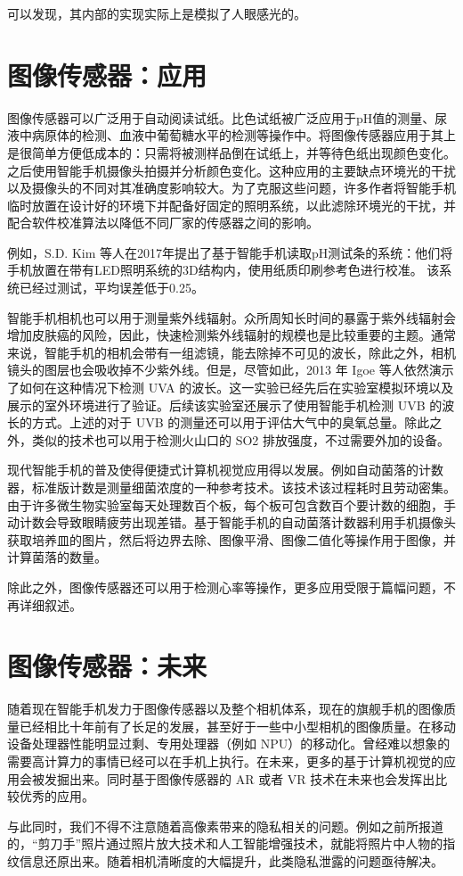 \documentclass[lang=cn]{elegantpaper}
\begin{document}
可以发现，其内部的实现实际上是模拟了人眼感光的。

\section{图像传感器：应用}

图像传感器可以广泛用于自动阅读试纸。比色试纸被广泛应用于pH值的测量、尿液中病原体的检测、血液中葡萄糖水平的检测等操作中。将图像传感器应用于其上是很简单方便低成本的：只需将被测样品倒在试纸上，并等待色纸出现颜色变化。之后使用智能手机摄像头拍摄并分析颜色变化。这种应用的主要缺点环境光的干扰以及摄像头的不同对其准确度影响较大。为了克服这些问题，许多作者将智能手机临时放置在设计好的环境下并配备好固定的照明系统，以此滤除环境光的干扰，并配合软件校准算法以降低不同厂家的传感器之间的影响。

例如，S.D. Kim 等人在2017年提出了基于智能手机读取pH测试条的系统\cite{kim2017smartphone}：他们将手机放置在带有LED照明系统的3D结构内，使用纸质印刷参考色进行校准。 该系统已经过测试，平均误差低于0.25。


智能手机相机也可以用于测量紫外线辐射。众所周知长时间的暴露于紫外线辐射会增加皮肤癌的风险，因此，快速检测紫外线辐射的规模也是比较重要的主题。通常来说，智能手机的相机会带有一组滤镜，能去除掉不可见的波长，除此之外，相机镜头的图层也会吸收掉不少紫外线。但是，尽管如此，2013 年 Igoe 等人依然演示了如何在这种情况下检测 UVA 的波长\cite{igoe2013characterization}。这一实验已经先后在实验室模拟环境以及展示的室外环境进行了验证。后续该实验室还展示了使用智能手机检测 UVB 的波长的方式。上述的对于 UVB 的测量还可以用于评估大气中的臭氧总量\cite{igoe2018atmospheric}。除此之外，类似的技术也可以用于检测火山口的 SO2 排放强度\cite{wilkes2017low}，不过需要外加的设备。

现代智能手机的普及使得便捷式计算机视觉应用得以发展。例如自动菌落的计数器，标准版计数是测量细菌浓度的一种参考技术。该技术该过程耗时且劳动密集。由于许多微生物实验室每天处理数百个板，每个板可包含数百个要计数的细胞，手动计数会导致眼睛疲劳出现差错。基于智能手机的自动菌落计数器利用手机摄像头获取培养皿的图片，然后将边界去除、图像平滑、图像二值化等操作用于图像，并计算菌落的数量\cite{minoi2016mobile}。

除此之外，图像传感器还可以用于检测心率等操作，更多应用受限于篇幅问题，不再详细叙述。

\section{图像传感器：未来}

随着现在智能手机发力于图像传感器以及整个相机体系，现在的旗舰手机的图像质量已经相比十年前有了长足的发展，甚至好于一些中小型相机的图像质量。在移动设备处理器性能明显过剩、专用处理器（例如 NPU）的移动化。曾经难以想象的需要高计算力的事情已经可以在手机上执行。在未来，更多的基于计算机视觉的应用会被发掘出来。同时基于图像传感器的 AR 或者 VR 技术在未来也会发挥出比较优秀的应用。

与此同时，我们不得不注意随着高像素带来的隐私相关的问题。例如之前所报道的，“剪刀手”照片通过照片放大技术和人工智能增强技术，就能将照片中人物的指纹信息还原出来。随着相机清晰度的大幅提升，此类隐私泄露的问题亟待解决。



\end{document}
